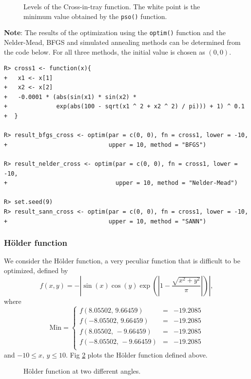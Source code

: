 \documentclass[10pt,letterpaper]{article}
\begin{document}
\begin{figure}[H]
\centering
\caption{Levels of the Cross-in-tray function.
The white point is the minimum value obtained by the \texttt{pso()} function.}
\label{curves_cross}
\end{figure}

\noindent
\textbf{Note}: The results of the optimization using the \texttt{optim()} function and the Nelder-Mead, BFGS and simulated annealing
methods can be determined from the code below.
For all three  methods, the initial value is chosen as $(0, 0)$.
\begin{verbatim}
R> cross1 <- function(x){
+   x1 <- x[1]
+   x2 <- x[2]
+   -0.0001 * (abs(sin(x1) * sin(x2) *
+              exp(abs(100 - sqrt(x1 ^ 2 + x2 ^ 2) / pi))) + 1) ^ 0.1
+  }

R> result_bfgs_cross <- optim(par = c(0, 0), fn = cross1, lower = -10,
+                             upper = 10, method = "BFGS")

R> result_nelder_cross <- optim(par = c(0, 0), fn = cross1, lower = -10,
+                               upper = 10, method = "Nelder-Mead")

R> set.seed(9)
R> result_sann_cross <- optim(par = c(0, 0), fn = cross1, lower = -10,
+                             upper = 10, method = "SANN")
\end{verbatim}

\subsubsection{H\"{o}lder function}

We consider the H\"{o}lder function, a very peculiar function that is difficult to be optimized, defined by
$$f(x,y) = - \left| \sin(x) \cos(y) \exp \left( \left| 1 - \frac{\sqrt{x^2 + y^2}}{\pi}  \right|  \right)   \right|,$$
where
$$
\mathrm{Min} = \left\{
\begin{array}{ccc}
f(8.05502,\, 9.66459) & = & -19.2085
\\
f(-8.05502,\, 9.66459) & = & -19.2085
\\
f(8.05502,\, -9.66459) & = & -19.2085
\\
f(-8.05502,\,-9.66459) & = & -19.2085
\\
\end{array}
\right.
$$
and $-10 \leq x,\, y \leq 10$.
Fig \ref{fig:holder}  plots the H\"{o}lder function defined above.

\begin{figure}[H]
	\centering
	\subfigure{
		\label{fig:holder2}
	}
	\subfigure{
		\label{fig:holder1}
	}
	\caption{H\"{o}lder function at two different angles.}
	\label{fig:holder}
\end{figure}
\end{document}
